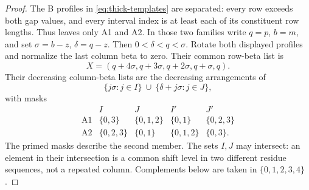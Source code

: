 \documentclass[11pt,a4paper]{amsart}
\numberwithin{equation}{section}
\theoremstyle{plain}
\theoremstyle{definition}
\begin{document}
\begin{proof}
The B profiles in \eqref{eq:thick-templates} are separated: every row
exceeds both gap values, and every interval index is at least each of
its constituent row lengths.  Thus  leaves
only A1 and A2.  In those two families write \(q=p\), \(b=m\),
and set \(\sigma=b-z\), \(\delta=q-z\).  Then
\(0<\delta<q<\sigma\).  Rotate both displayed profiles and normalize
the last column beta to zero.  Their common row-beta list is
\[
 X=(q+4\sigma,q+3\sigma,q+2\sigma,q+\sigma,q).
\]
Their decreasing column-beta lists are the decreasing arrangements of
\[
 \{j\sigma:j\in I\}\ \cup\ \{\delta+j\sigma:j\in J\},
\]
with masks
\[
\begin{array}{c|cc|cc}
 &I&J&I'&J'\\\hline
\mathrm{A1}&\{0,3\}&\{0,1,2\}&\{0,1\}&\{0,2,3\}\\
\mathrm{A2}&\{0,2,3\}&\{0,1\}&\{0,1,2\}&\{0,3\}.
\end{array}
\]
The primed masks describe the second member.  The sets \(I,J\) may
intersect: an element in their intersection is a common shift level in
two different residue sequences, not a repeated column.  Complements
below are taken in \(\{0,1,2,3,4\}\).


\end{proof}
\end{document}
